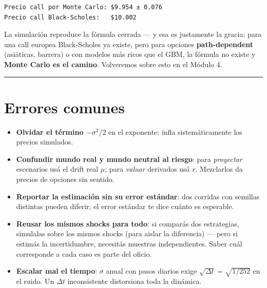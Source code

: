 \documentclass[
  spanish,
  letterpaper,
  DIV=11,
  numbers=noendperiod]{scrreprt}
\providecommand{\tightlist}{%
  \setlength{\itemsep}{0pt}\setlength{\parskip}{0pt}}
\begin{document}
\begin{verbatim}
Precio call por Monte Carlo: $9.954 ± 0.076
Precio call Black-Scholes:   $10.002
\end{verbatim}

La simulación reproduce la fórmula cerrada --- y esa es justamente la
gracia: para una call europea Black-Scholes ya existe, pero para
opciones \textbf{path-dependent} (asiáticas, barrera) o con modelos más
ricos que el GBM, la fórmula no existe y \textbf{Monte Carlo es el
camino}. Volveremos sobre esto en el Módulo 4.

\begin{center}\rule{0.5\linewidth}{0.5pt}\end{center}

\chapter{Errores comunes}\label{errores-comunes-11}

\begin{tcolorbox}[enhanced jigsaw, bottomrule=.15mm, colback=white, opacitybacktitle=0.6, arc=.35mm, toprule=.15mm, opacityback=0, breakable, titlerule=0mm, left=2mm, coltitle=black, colbacktitle=quarto-callout-warning-color!10!white, colframe=quarto-callout-warning-color-frame, leftrule=.75mm, toptitle=1mm, bottomtitle=1mm, title=\textcolor{quarto-callout-warning-color}{\faExclamationTriangle}\hspace{0.5em}{Trampas frecuentes}, rightrule=.15mm]

\begin{itemize}
\tightlist
\item
  \textbf{Olvidar el término \(-\sigma^2/2\)} en el exponente: infla
  sistemáticamente los precios simulados.
\item
  \textbf{Confundir mundo real y mundo neutral al riesgo}: para
  \emph{proyectar} escenarios usá el drift real \(\mu\); para
  \emph{valuar} derivados usá \(r\). Mezclarlos da precios de opciones
  sin sentido.
\item
  \textbf{Reportar la estimación sin su error estándar}: dos corridas
  con semillas distintas pueden diferir; el error estándar te dice
  cuánto es esperable.
\item
  \textbf{Reusar los mismos shocks para todo}: si comparás dos
  estrategias, simulalas sobre los mismos shocks (para aislar la
  diferencia) --- pero si estimás la incertidumbre, necesitás muestras
  independientes. Saber cuál corresponde a cada caso es parte del
  oficio.
\item
  \textbf{Escalar mal el tiempo}: \(\sigma\) anual con pasos diarios
  exige \(\sqrt{\Delta t} = \sqrt{1/252}\) en el ruido. Un \(\Delta t\)
  inconsistente distorsiona toda la dinámica.
\end{itemize}

\end{tcolorbox}
\end{document}
